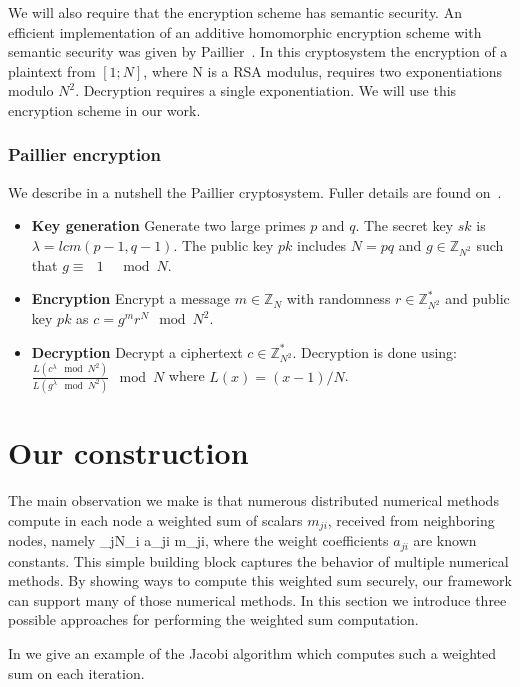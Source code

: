 \documentclass[10pt]{svjour3}
\begin{document}
We will also  require that the encryption scheme has semantic
security. An efficient implementation of an additive homomorphic
encryption scheme with semantic security was given by
Paillier~\cite{Paillier}. In this cryptosystem the encryption of a
plaintext from $[1;N]$, where N is a RSA modulus, requires two
exponentiations modulo $N^2$. Decryption requires a single
exponentiation. We will use this encryption scheme in our work.

\subsubsection{Paillier encryption}
We describe in a nutshell the Paillier cryptosystem. Fuller
details are found on~\cite{Paillier}.
\begin{itemize}
    \item {\bf Key generation} Generate two large primes $p$
and $q$. The secret key $sk$ is $\lambda = lcm(p - 1, q - 1)$. The
public key $pk$ includes $N = pq$ and $g  \in \mathbb{Z}_{N^2}$
such that $g \equiv \mbox{  }1 \mbox{  } \mod N$.
    \item {\bf Encryption} Encrypt a message $m \in \mathbb{Z}_{N}$ with randomness
$r \in \mathbb{Z}_{N^2}^*$ and public key $pk$ as $c = g^mr^N \mod
N^2$.
    \item {\bf Decryption} Decrypt a ciphertext $c \in \mathbb{Z}_{N^2}^*$.
    Decryption is done using: $\frac{L(c^\lambda \mod N^2)}{L(g^\lambda \mod
    N^2)} \mod N$ where $L(x) = (x - 1)/N$.
\end{itemize}



\section{Our construction}
\label{sec:semi_honest} \label{const} The main observation we make
is that numerous distributed numerical methods compute in each
node a weighted sum of scalars $m_{ji}$, received from neighboring
nodes, namely \BE \label{ws} \sum_{j\in N_i} a_{ji} m_{ji}\;, \EE
where the weight coefficients $a_{ji}$  are known constants. This
simple building block captures the behavior of multiple numerical
methods. By showing ways to compute this weighted sum securely,
our framework can support many of those numerical methods. In this
section we introduce three possible approaches for performing the
weighted sum computation.

In  we give an example of the Jacobi algorithm
which computes such a weighted sum on each iteration.
\end{document}
